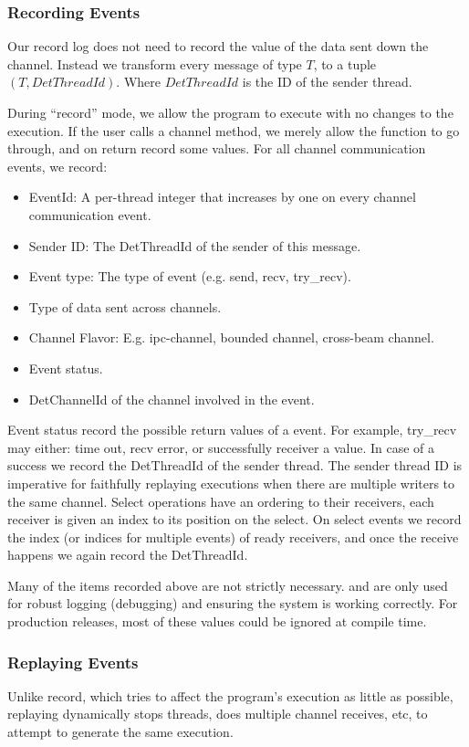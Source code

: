\documentclass{article}
\begin{document}
\subsubsection{Recording Events}
Our record log does not need to record the value of the data sent down the channel. Instead
we transform every message of type $T$, to a tuple $(T, DetThreadId)$. Where $DetThreadId$
is the ID of the sender thread.

During ``record'' mode, we allow the program to execute with no changes to the execution.
If the user calls a channel method, we merely allow the function to go through, and on
return record some values. For all channel communication events, we record:
\begin{itemize}
\item EventId: A per-thread integer that increases by one on every channel communication
  event.
\item Sender ID: The DetThreadId of the sender of this message.
\item Event type: The type of event (e.g. send, recv, try\_recv).
\item Type of data sent across channels.
  \item Channel Flavor: E.g. ipc-channel, bounded channel, cross-beam channel.
\item Event status.
\item DetChannelId of the channel involved in the event.
\end{itemize}

Event status record the possible return values of a event. For example, try\_recv
may either: time out, recv error, or successfully receiver a value. In case of a
success we record the DetThreadId of the sender thread. The sender thread ID is
imperative for faithfully replaying executions when there are multiple writers
to the same channel.
Select operations have an ordering to their receivers, each receiver is given
an index to its position on the select. On select events we record the
index (or indices for multiple events) of ready receivers, and once the receive
happens we again record the DetThreadId.

Many of the items recorded above are not strictly necessary. and are only used for
robust logging (debugging) and ensuring the system is working correctly. For production
releases, most of these values could be ignored at compile time.

\subsubsection{Replaying Events}
Unlike record, which tries to affect the program's execution as little as possible,
replaying dynamically stops threads, does multiple channel receives, etc, to attempt
to generate the same execution.
\end{document}
